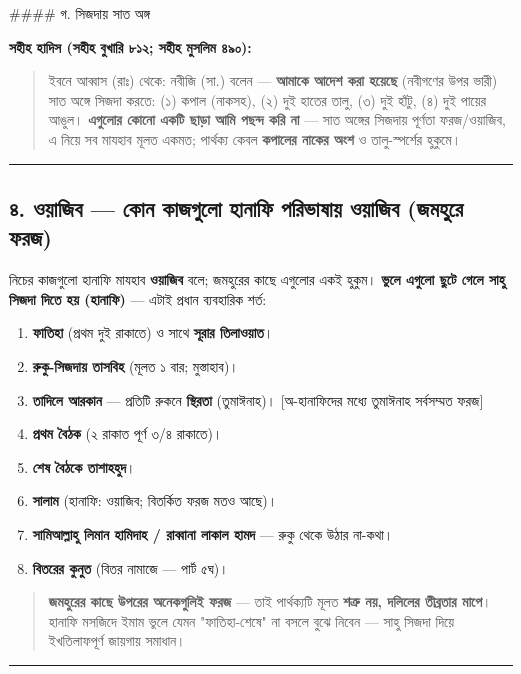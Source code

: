\#\#\#\# গ. সিজদায় সাত অঙ্গ

\textbf{সহীহ হাদিস (সহীহ বুখারি ৮১২; সহীহ মুসলিম ৪৯০):}

\begin{quote}
ইবনে আব্বাস (রাঃ) থেকে: নবীজি (সা.) বলেন — \textbf{আমাকে আদেশ করা হয়েছে} (নবীগণের উপর ভারী) সাত অঙ্গে সিজদা করতে: (১) কপাল (নাকসহ), (২) দুই হাতের তালু, (৩) দুই হাঁটু, (৪) দুই পায়ের আঙুল। \textbf{এগুলোর কোনো একটি ছাড়া আমি পছন্দ করি না} — সাত অঙ্গের সিজদায় পূর্ণতা ফরজ/ওয়াজিব, এ নিয়ে সব মাযহাব মূলত একমত; পার্থক্য কেবল \textbf{কপালের নাকের অংশ} ও তালু-স্পর্শের হুকুমে।
\end{quote}

\medskip\hrule\medskip

\subsection*{৪. ওয়াজিব — কোন কাজগুলো হানাফি পরিভাষায় ওয়াজিব (জমহুরে ফরজ)}

নিচের কাজগুলো হানাফি মাযহাব \textbf{ওয়াজিব} বলে; জমহুরের কাছে এগুলোর একই হুকুম। \textbf{ভুলে এগুলো ছুটে গেলে সাহু সিজদা দিতে হয় (হানাফি)} — এটাই প্রধান ব্যবহারিক শর্ত:

\begin{enumerate}
\item \textbf{ফাতিহা} (প্রথম দুই রাকাতে) ও সাথে \textbf{সূরার তিলাওয়াত}।
\item \textbf{রুকু-সিজদায় তাসবিহ} (মূলত ১ বার; মুস্তাহাব)।
\item \textbf{তাদিলে আরকান} — প্রতিটি রুকনে \textbf{স্থিরতা} (তুমাঈনাহ)। [অ-হানাফিদের মধ্যে তুমাঈনাহ সর্বসম্মত ফরজ]
\item \textbf{প্রথম বৈঠক} (২ রাকাত পূর্ণ ৩/৪ রাকাতে)।
\item \textbf{শেষ বৈঠকে তাশাহহুদ}।
\item \textbf{সালাম} (হানাফি: ওয়াজিব; বিতর্কিত ফরজ মতও আছে)।
\item \textbf{সামিআল্লাহু লিমান হামিদাহ / রাব্বানা লাকাল হামদ} — রুকু থেকে উঠার না-কথা।
\item \textbf{বিতরের কুনুত} (বিতর নামাজে — পার্ট ৫ঘ)।
\end{enumerate}
\begin{quote}
\textbf{জমহুরের কাছে উপরের অনেকগুলিই ফরজ} — তাই পার্থক্যটি মূলত \textbf{শত্রু নয়, দলিলের তীব্রতার মাপে}। হানাফি মসজিদে ইমাম ভুলে যেমন "ফাতিহা-শেষে" না বসলে বুঝে নিবেন — সাহু সিজদা দিয়ে ইখতিলাফপূর্ণ জায়গায় সমাধান।
\end{quote}

\medskip\hrule\medskip

